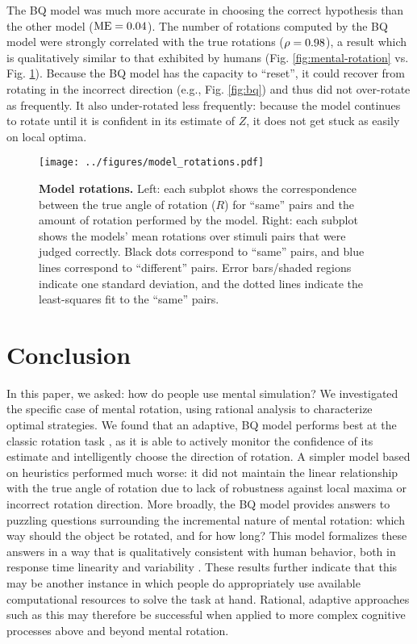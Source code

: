 \documentclass{article} %
\begin{document}
The BQ model was much more accurate in choosing the correct hypothesis
than the other model ($\mathrm{ME}{}=0.04{}$). The number of rotations computed by
the BQ model were strongly correlated with the true rotations
($\rho=0.98$), a result which is qualitatively similar to that exhibited
by humans (Fig. \ref{fig:mental-rotation}
vs. Fig. \ref{fig:rotations}). Because the BQ model has the capacity
to ``reset'', it could recover from rotating in the incorrect
direction (e.g., Fig. \ref{fig:bq}) and thus did not over-rotate as
frequently.  It also under-rotated less frequently: because the model
continues to rotate until it is confident in its estimate of $Z$, it
does not get stuck as easily on local optima.

\begin{figure}[t]
  \centering
  \texttt{[image: ../figures/model\_rotations.pdf]}
  \caption{\textbf{Model rotations.} Left: each subplot shows the
    correspondence between the true angle of rotation ($R$) for
    ``same'' pairs and the amount of rotation performed by the
    model. Right: each subplot shows the models' mean rotations over
    stimuli pairs that were judged correctly. Black dots correspond to
    ``same'' pairs, and blue lines correspond to ``different''
    pairs. Error bars/shaded regions indicate one standard deviation,
    and the dotted lines indicate the least-squares fit to the
    ``same'' pairs.}
  \label{fig:rotations}
\end{figure}


\section{Conclusion}

In this paper, we asked: how do people use mental simulation?  We
investigated the specific case of mental rotation, using rational
analysis to characterize optimal strategies. We found that an
adaptive, BQ model performs best at the classic rotation task
\cite{Shepard1971}, as it is able to actively monitor the confidence
of its estimate and intelligently choose the direction of rotation. A
simpler model based on heuristics performed much worse: it did not
maintain the linear relationship with the true angle of rotation due
to lack of robustness against local maxima or incorrect rotation
direction.  More broadly, the BQ model provides answers to puzzling
questions surrounding the incremental nature of mental rotation: which
way should the object be rotated, and for how long? This model
formalizes these answers in a way that is qualitatively consistent
with human behavior, both in response time linearity
\cite{Shepard1971} and variability \cite{Just1976}. These results
further indicate that this may be another instance in which people do
appropriately use available computational resources to solve the task
at hand.  Rational, adaptive approaches such as this may therefore be
successful when applied to more complex cognitive processes above and
beyond mental rotation.


\renewcommand\refname{\normalsize{References}}

{\small }
\end{document}
